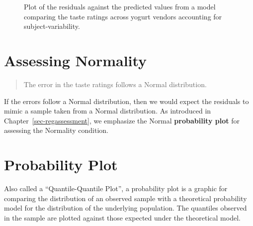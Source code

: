 \documentclass[
  letterpaper,
  DIV=11,
  numbers=noendperiod]{scrreprt}
\theoremstyle{definition}
\theoremstyle{definition}
\theoremstyle{plain}
\theoremstyle{remark}
\begin{document}
\begin{figure}


\caption{\label{fig-blockassessment-variance-yogurt}Plot of the
residuals against the predicted values from a model comparing the taste
ratings across yogurt vendors accounting for subject-variability.}

\end{figure}%

\section{Assessing Normality}\label{assessing-normality-2}

\begin{quote}
The error in the taste ratings follows a Normal distribution.
\end{quote}

If the errors follow a Normal distribution, then we would expect the
residuals to mimic a sample taken from a Normal distribution. As
introduced in Chapter~\ref{sec-regassessment}, we emphasize the Normal
\textbf{probability plot} for assessing the Normality condition.

\section{Probability Plot}\label{probability-plot-2}

Also called a ``Quantile-Quantile Plot'', a probability plot is a
graphic for comparing the distribution of an observed sample with a
theoretical probability model for the distribution of the underlying
population. The quantiles observed in the sample are plotted against
those expected under the theoretical model.
\end{document}
